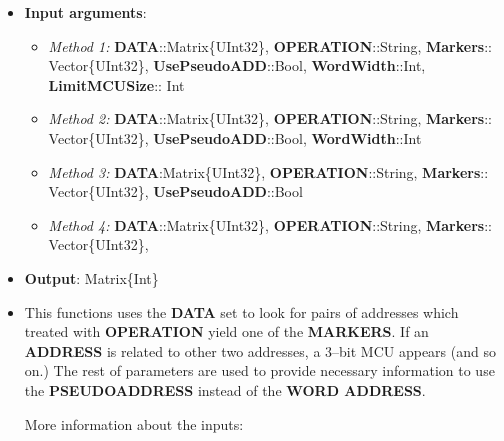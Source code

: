  \begin{itemize}
 	\item \textbf{Input arguments}: 
 		\begin{itemize}
 			\item \textit{Method 1: } \textbf{DATA}::Matrix\{UInt32\}, 
 			\textbf{OPERATION}::String,
 			\textbf{Markers}:: Vector\{UInt32\}, 
 			\textbf{UsePseudoADD}::Bool, 
 			\textbf{WordWidth}::Int,
 			\textbf{LimitMCUSize}:: Int
 			\item \textit{Method 2: } \textbf{DATA}::Matrix\{UInt32\}, 
 			\textbf{OPERATION}::String,
 			\textbf{Markers}:: Vector\{UInt32\}, 
 			\textbf{UsePseudoADD}::Bool, 
 			\textbf{WordWidth}::Int
 			\item \textit{Method 3: } \textbf{DATA}:Matrix\{UInt32\}, 
 			\textbf{OPERATION}::String,
 			\textbf{Markers}:: Vector\{UInt32\}, 
 			\textbf{UsePseudoADD}::Bool
 			\item \textit{Method 4: } \textbf{DATA}::Matrix\{UInt32\}, 
 			\textbf{OPERATION}::String,
 			\textbf{Markers}:: Vector\{UInt32\}, 
 		\end{itemize}
 	\item \textbf{Output}: Matrix\{Int\}
 	\item This functions uses the \textbf{DATA} set to look for pairs of addresses which treated with 	 \textbf{OPERATION} yield one of the \textbf{MARKERS}. If an \textbf{ADDRESS} is related to other two addresses, 	 a 3--bit MCU appears (and so on.) The rest of parameters are used to provide necessary  information to use the \textbf{PSEUDOADDRESS} instead of the \textbf{WORD ADDRESS}. 
	 
	 More information about the inputs:
	 

\end{itemize}
